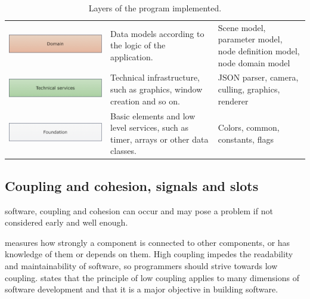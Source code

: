 \documentclass[%
    a4paper,    %
    justified,  %
    nobib,      %
    openany     %
]{tufte-book}
\makeatletter
\renewcommand{\label}[1]{\@tufte@label{##1}}%
\makeatother
\begin{document}
\begin{table}[h]
\begin{tabularx}{\textwidth}{XXX}
    \includegraphics[width=1.0\linewidth]{images/layers-domain}      & Data models according to the logic of the application.                              & Scene model, parameter model, node definition model, node domain model     \\
    \includegraphics[width=1.0\linewidth]{images/layers-technical}   & Technical infrastructure, such as graphics, window creation and so on.              & JSON parser, camera, culling, graphics, renderer                           \\
    \includegraphics[width=1.0\linewidth]{images/layers-foundation}  & Basic elements and low level services, such as timer, arrays or other data classes. & Colors, common, constants, flags                                           \\
    \bottomrule
  \end{tabularx}
  \vspace*{\baselineskip}
  \caption{Layers of the program implemented.}
\label{table:results:layers}
\end{table}

\subsection{Coupling and cohesion, signals and slots}
\label{results:subsec:signals}

 software, coupling and cohesion
can occur and may pose a problem if not considered early and well enough.

 measures how strongly a component is connected to other
components, or has knowledge of them or depends on them. High coupling impedes
the readability and maintainability of software, so programmers should strive
towards low coupling.  states that the
principle of low coupling applies to many dimensions of software development and
that it is a major objective in building software.~\cite{larman-applying-2004}
\end{document}
